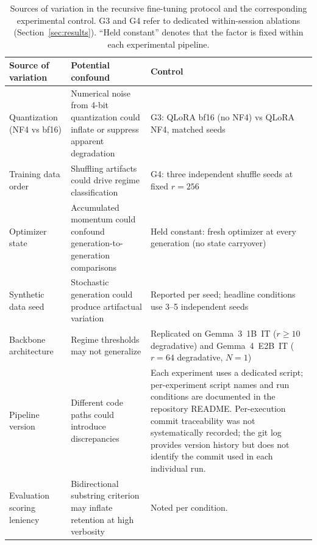 \documentclass[a4paper,fleqn]{cas-dc}
\newif\ifshowchanges
\newcommand{\rev}[1]{\ifshowchanges{\color{blue}#1}\else{#1}\fi}
\renewcommand{\arraystretch}{1.8}
\begin{document}
\begin{table}[pos=t,width=\textwidth]
\renewcommand{\arraystretch}{1.2}
\caption{\rev{Sources of variation in the recursive fine-tuning
protocol and the corresponding experimental control. G3 and G4 refer to
dedicated within-session ablations (Section~\ref{sec:results}). ``Held
constant'' denotes that the factor is \rev{fixed within each experimental pipeline}.}}
\label{tab:controls}
\small
\setlength{\tabcolsep}{4pt}
\begin{tabularx}{\textwidth}{@{}
    >{\raggedright\arraybackslash}p{}
    >{\raggedright\arraybackslash}p{}
    X
@{}}
\toprule
\textbf{Source of variation} &
\textbf{Potential confound} &
\textbf{Control} \\
\midrule

Quantization (NF4 vs bf16) &
Numerical noise from 4-bit quantization could inflate or suppress apparent degradation &
G3: QLoRA bf16 (no NF4) vs QLoRA NF4, matched seeds \\

\addlinespace

Training data order &
Shuffling artifacts could drive regime classification &
G4: three independent shuffle seeds at fixed $r=256$ \\

\addlinespace

Optimizer state &
Accumulated momentum could confound generation-to-generation comparisons &
Held constant: fresh optimizer at every generation (no state carryover) \\

\addlinespace

Synthetic data seed &
Stochastic generation could produce artifactual variation &
Reported per seed; headline conditions use 3--5 independent seeds \\

\addlinespace

Backbone architecture &
Regime thresholds may not generalize &
Replicated on Gemma~3~1B~IT ($r\geq10$ degradative) and Gemma~4~E2B~IT ($r=64$ degradative, $N=1$) \\

\addlinespace

Pipeline version &
Different code paths could introduce discrepancies &
\rev{Each experiment uses a dedicated script; per-experiment script names and run conditions are documented in the repository README. \rev{Per-execution commit traceability was not systematically recorded; the git log provides version history but does not identify the commit used in each individual run.}} \\

\addlinespace

Evaluation scoring leniency &
Bidirectional substring criterion may inflate retention at high verbosity &
Noted per condition. \\

\bottomrule
\end{tabularx}
\end{table}
\end{document}
